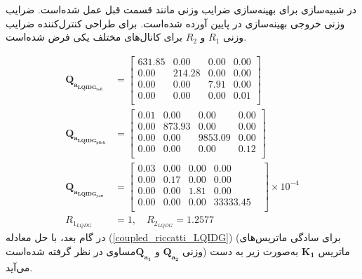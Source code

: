 در شبیه‌سازی برای بهینه‌سازی ضرایب وزنی مانند قسمت قبل عمل شده‌است. ضرایب وزنی خروجی بهینه‌سازی در پایین آورده شده‌است. برای طراحی کنترل‌کننده
ضرایب وزنی
$R_1$
و
$R_2$
برای کانال‌های مختلف یکی فرض شده‌است.

\begin{equation}
	\begin{split}
		\boldsymbol{Q_{a_{LQIDG_{roll}}}} &= \begin{bmatrix}
			631.85 & 0.00 & 0.00 & 0.00  \\ 
			0.00 & 214.28 & 0.00 & 0.00  \\ 
			0.00 & 0.00 & 7.91 & 0.00  \\ 
			0.00 & 0.00 & 0.00 & 0.01  \\ 
		\end{bmatrix} \\
		\boldsymbol{Q_{a_{LQIDG_{pitch}}}} &= \begin{bmatrix}
			0.01 & 0.00 & 0.00 & 0.00  \\
			0.00 & 873.93 & 0.00 & 0.00  \\ 
			0.00 & 0.00 & 9853.09 & 0.00 \\ 
			0.00 & 0.00 & 0.00 & 0.12  \\ 
		\end{bmatrix}\\
		\boldsymbol{Q_{a_{LQIDG_{yaw}}}}  &= \begin{bmatrix}
			0.03 & 0.00 & 0.00 & 0.00 & \\ 
			0.00 & 0.17 & 0.00 & 0.00 & \\ 
			0.00 & 0.00 & 1.81 & 0.00 & \\ 
			0.00 & 0.00 & 0.00 & 33333.45 & \\
		\end{bmatrix}\times 10^{-4}\\  R_{1_{LQDG}} &= 1, \quad  R_{2_{LQDG}} = 1.2577
	\end{split}
\end{equation}
در گام بعد، با حل معادله
(\ref{coupled_riccatti_LQIDG})
(برای سادگی ماتریس‌های وزنی $\boldsymbol{{Q}_{a_2}}$ و $\boldsymbol{{Q}_{a_1}}$مساوی در نظر گرفته شده‌است)
ماتریس
$\boldsymbol{{K}_1}$
به‌صورت زیر به دست می‌آید.
